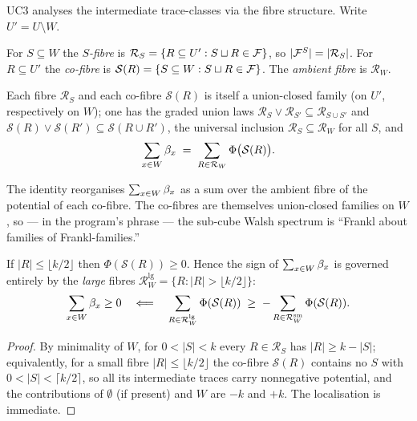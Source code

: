 UC3 analyses the intermediate trace-classes via the fibre structure.
Write $U'=U\setminus W$.

\begin{definition}
\label{def:fibre}
For $S\subseteq W$ the \emph{$S$-fibre} is
$\mathcal R_S=\{R\subseteq U':S\sqcup R\in\mathcal{F}\}$, so $|\mathcal{F}^S|=|\mathcal
R_S|$. For $R\subseteq U'$ the \emph{co-fibre} is
$\mathcal S(R)=\{S\subseteq W:S\sqcup R\in\mathcal{F}\}$. The \emph{ambient
fibre} is $\mathcal R_W$.
\end{definition}

\begin{proposition}[UC3 \S2]
\label{prop:fibre-structure}
Each fibre $\mathcal R_S$ and each co-fibre $\mathcal S(R)$ is itself a
union-closed family (on $U'$, respectively on $W$); one has the
graded union laws $\mathcal R_S\vee\mathcal R_{S'}\subseteq\mathcal
R_{S\cup S'}$ and $\mathcal S(R)\vee\mathcal S(R')\subseteq\mathcal
S(R\cup R')$, the universal inclusion $\mathcal R_S\subseteq\mathcal
R_W$ for all $S$, and
\[
  \sum_{x\in W}\beta_x \;=\;\sum_{R\in\mathcal R_W}\Phi\bigl(\mathcal
  S(R)\bigr).
\]
\end{proposition}

The identity reorganises $\sum_{x\in W}\beta_x$ as a sum over the
ambient fibre of the potential of each co-fibre. The co-fibres are
themselves union-closed families on $W$, so --- in the program's phrase
--- the sub-cube Walsh spectrum is ``Frankl about families of
Frankl-families.''

\begin{theorem}
\label{thm:uc3-localisation}
If $|R|\le\lfloor k/2\rfloor$ then $\Phi(\mathcal S(R))\ge0$. Hence the
sign of $\sum_{x\in W}\beta_x$ is governed entirely by the
\emph{large} fibres $\mathcal R_W^{\mathrm{lg}}=\{R:|R|>\lfloor
k/2\rfloor\}$:
\[
  \sum_{x\in W}\beta_x\ge0
  \quad\Longleftarrow\quad
  \sum_{R\in\mathcal R_W^{\mathrm{lg}}}\Phi(\mathcal S(R))
  \;\ge\;-\sum_{R\in\mathcal R_W^{\mathrm{sm}}}\Phi(\mathcal S(R)).
\]
\end{theorem}

\begin{proof}
By minimality of $W$, for $0<|S|<k$ every $R\in\mathcal R_S$ has
$|R|\ge k-|S|$; equivalently, for a small fibre $|R|\le\lfloor
k/2\rfloor$ the co-fibre $\mathcal S(R)$ contains no $S$ with
$0<|S|<\lceil k/2\rceil$, so all its intermediate traces carry
nonnegative potential, and the contributions of $\emptyset$ (if
present) and $W$ are $-k$ and $+k$. The localisation is immediate.
\end{proof}

